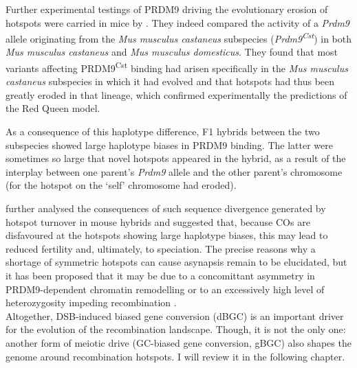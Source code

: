 Further experimental testings of PRDM9 driving the evolutionary erosion of hotspots were carried in mice by \citet{baker2015prdm9}.
They indeed compared the activity of a \textit{Prdm9} allele originating from the \textit{Mus musculus castaneus} subspecies (\textit{Prdm9\textsuperscript{Cst}}) in both \textit{Mus musculus castaneus} and \textit{Mus musculus domesticus}.
They found that most variants affecting PRDM9\textsuperscript{Cst} binding had arisen specifically in the \textit{Mus musculus castaneus} subspecies in which it had evolved and that hotspots had thus been greatly eroded in that lineage, which confirmed experimentally the predictions of the Red Queen model.

As a consequence of this haplotype difference, F1 hybrids between the two subspecies showed large haplotype biases in PRDM9 binding.
The latter were sometimes so large that novel hotspots appeared in the hybrid, as a result of the interplay between one parent's \textit{Prdm9} allele and the other parent's chromosome (for the hotspot on the ‘self’ chromosome had eroded).

\citet{smagulova2016evolutionary} further analysed the consequences of such sequence divergence generated by hotspot turnover in mouse hybrids and suggested that, because COs are disfavoured at the hotspots showing large haplotype biases, this may lead to reduced fertility and, ultimately, to speciation.
The precise reasons why a shortage of symmetric hotspots can cause asynapsis remain to be elucidated, but it has been proposed that it may be due to a concomittant asymmetry in PRDM9-dependent chromatin remodelling \citep{davies2016reengineering} or to an excessively high level of heterozygosity impeding recombination \citep{gregorova2018modulation}.\\




Altogether, DSB-induced biased gene conversion (dBGC) is an important driver for the evolution of the recombination landscape.
Though, it is not the only one: another form of meiotic drive (GC-biased gene conversion, gBGC) also shapes the genome around recombination hotspots. 
I will review it in the following chapter.







